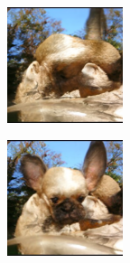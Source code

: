 \documentclass{article}
\begin{document}
\begin{figure}
\begin{subfigure}[b]{0.5\linewidth}
\begin{subfigure}[b]{0.242\linewidth}
        \end{subfigure}%
        \begin{subfigure}[b]{0.242\linewidth}
        \includegraphics[width=\linewidth]{figures/imagenet128/solver_samples/imagenet128_fm_ot_99_20.png}
        \end{subfigure}%
        \begin{subfigure}[b]{0.242\linewidth}
        \includegraphics[width=\linewidth]{figures/imagenet128/solver_samples/imagenet128_fm_ot_99_50.png}

\end{subfigure}
\end{subfigure}
\end{figure}
\end{document}
